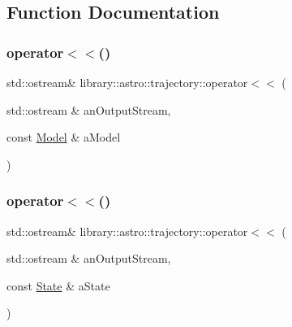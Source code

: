 \subsection{Function Documentation}
\mbox{\label{namespacelibrary_1_1astro_1_1trajectory_af5701f69fca5faeab4247331d0348f6c}} 
\subsubsection{\texorpdfstring{operator$<$$<$()}{operator<<()}\hspace{0.1cm}{\footnotesize\ttfamily [1/2]}}
{\footnotesize\ttfamily std\+::ostream\& library\+::astro\+::trajectory\+::operator$<$$<$ (\begin{DoxyParamCaption}\item[{std\+::ostream \&}]{an\+Output\+Stream,  }\item[{const \hyperlink{classlibrary_1_1astro_1_1trajectory_1_1_model}{Model} \&}]{a\+Model }\end{DoxyParamCaption})}

\mbox{\label{namespacelibrary_1_1astro_1_1trajectory_a99391ca9edb771c6bd792e4a7366bf14}} 
\subsubsection{\texorpdfstring{operator$<$$<$()}{operator<<()}\hspace{0.1cm}{\footnotesize\ttfamily [2/2]}}
{\footnotesize\ttfamily std\+::ostream\& library\+::astro\+::trajectory\+::operator$<$$<$ (\begin{DoxyParamCaption}\item[{std\+::ostream \&}]{an\+Output\+Stream,  }\item[{const \hyperlink{classlibrary_1_1astro_1_1trajectory_1_1_state}{State} \&}]{a\+State }\end{DoxyParamCaption})}

